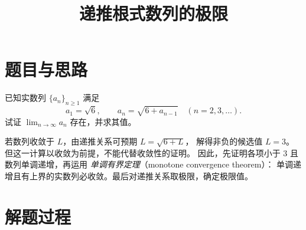 \documentclass[UTF8,12pt,a4paper,fontset=fandol]{ctexart}
\title{递推根式数列的极限}
\author{}
\date{}
\begin{document}
\maketitle

\section{题目与思路}

\begin{example}[原题 1.5.1]
已知实数列 $\{a_n\}_{n\ge1}$ 满足
\begin{equation}\label{eq:radical-recurrence}
  a_1=\sqrt{6},\qquad
  a_n=\sqrt{6+a_{n-1}}\quad(n=2,3,\ldots).
\end{equation}
试证 $\displaystyle\lim_{n\to\infty}a_n$ 存在，并求其值。
\end{example}

\begin{analyze}
若数列收敛于 $L$，由递推关系可预期 $L=\sqrt{6+L}$，
解得非负的候选值 $L=3$。但这一计算以收敛为前提，不能代替收敛性的证明。
因此，先证明各项小于 $3$ 且数列单调递增，再运用
\emph{单调有界定理}（monotone convergence theorem）：
单调递增且有上界的实数列必收敛。最后对递推关系取极限，确定极限值。
\end{analyze}

\section{解题过程}
\end{document}
